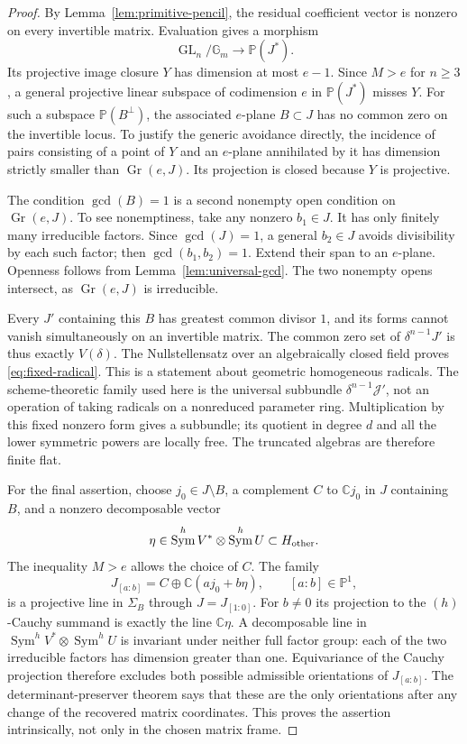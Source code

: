 \documentclass[11pt,reqno]{amsart}
\numberwithin{equation}{section}
\theoremstyle{definition}\newtheorem{definition}[theorem]{Definition}
\theoremstyle{remark}\newtheorem{remark}[theorem]{Remark}
\newcommand{\C}{\mathbb C}\newcommand{\Q}{\mathbb Q}
\newcommand{\Pj}{\mathbb P}\newcommand{\A}{\mathbb A}
\DeclareMathOperator{\Sym}{Sym}\DeclareMathOperator{\Gr}{Gr}
\begin{document}
\begin{proof}
By Lemma~\ref{lem:primitive-pencil}, the residual coefficient vector
is nonzero on every invertible matrix.  Evaluation gives a morphism
\[
 \operatorname{GL}_n/\mathbb G_m\longrightarrow\Pj(J^*).
\]
Its projective image closure \(Y\) has dimension at most \(e-1\).
Since \(M>e\) for \(n\ge3\), a general projective linear subspace
of codimension \(e\) in \(\Pj(J^*)\) misses \(Y\).  For such a
subspace \(\Pj(B^\perp)\), the associated \(e\)-plane \(B\subset J\)
has no common zero on the invertible locus.  To justify the generic
avoidance directly, the incidence of pairs consisting of a point
of \(Y\) and an \(e\)-plane annihilated by it has dimension strictly
smaller than \(\Gr(e,J)\).  Its projection is closed because
\(Y\) is projective.

The condition \(\gcd(B)=1\) is a second nonempty open condition
on \(\Gr(e,J)\).  To see nonemptiness, take any nonzero \(b_1\in J\).
It has only finitely many irreducible factors.  Since \(\gcd(J)=1\),
a general \(b_2\in J\) avoids divisibility by each such factor;
then \(\gcd(b_1,b_2)=1\).  Extend their span to an \(e\)-plane.
Openness follows from Lemma~\ref{lem:universal-gcd}.  The two
nonempty opens intersect, as \(\Gr(e,J)\) is irreducible.

Every \(J'\) containing this \(B\) has greatest common divisor
\(1\), and its forms cannot vanish simultaneously on an invertible
matrix.  The common zero set of \(\delta^{n-1}J'\) is thus exactly
\(V(\delta)\).  The Nullstellensatz over an algebraically closed
field proves \eqref{eq:fixed-radical}.  This is a statement about
geometric homogeneous radicals.  The scheme-theoretic family used
here is the universal subbundle \(\delta^{n-1}\mathcal J'\), not
an operation of taking radicals on a nonreduced parameter ring.
Multiplication by this fixed nonzero form gives a subbundle;
its quotient in degree \(d\) and all the lower symmetric powers
are locally free.  The truncated algebras are therefore finite flat.

For the final assertion, choose \(j_0\in J\setminus B\), a
complement \(C\) to \(\C j_0\) in \(J\) containing \(B\), and
a nonzero decomposable vector
\[
 \eta\in\Sym^h V^*\otimes\Sym^h U\subset H_{\rm other}.
\]
The inequality \(M>e\) allows the choice of \(C\).
The family
\[
      J_{[a:b]}=C\oplus\C(aj_0+b\eta),\qquad[a:b]\in\Pj^1,
\]
is a projective line in \(\Sigma_B\) through \(J=J_{[1:0]}\).
For \(b\ne0\) its projection to the \((h)\)-Cauchy summand is
exactly the line \(\C\eta\).  A decomposable line in
\(\Sym^h V^*\otimes\Sym^h U\) is invariant under neither full
factor group: each of the two irreducible factors has dimension
greater than one.  Equivariance of the Cauchy projection therefore
excludes both possible admissible orientations of \(J_{[a:b]}\).
The determinant-preserver theorem says that these are the only
orientations after any change of the recovered matrix coordinates.
This proves the assertion intrinsically, not only in the chosen
matrix frame.
\end{proof}
\end{document}
